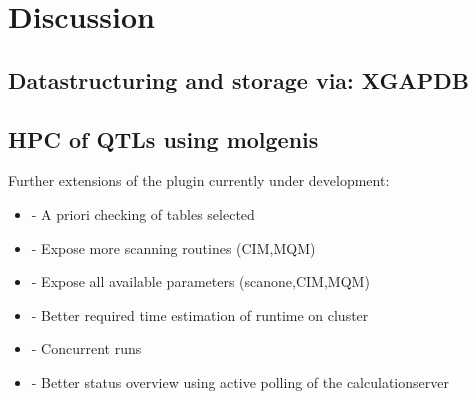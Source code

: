 \section{Discussion}
\subsection{Datastructuring and storage via: XGAPDB}

\subsection{HPC of QTLs using molgenis}
Further extensions of the plugin currently under development:
\begin{itemize}
	\item - A priori checking of tables selected
	\item - Expose more scanning routines (CIM,MQM)
	\item - Expose all available parameters (scanone,CIM,MQM)
	\item - Better required time estimation of runtime on cluster
	\item - Concurrent runs
	\item - Better status overview using active polling of the calculationserver
\end{itemize}